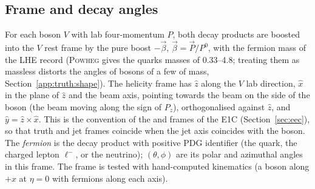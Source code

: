 \subsection{Frame and decay angles}
\label{app:truth:frame}
For each boson $V$ with lab four-momentum $P$, both decay products are boosted into the $V$ rest frame by the pure boost
$-\vec\beta$, $\vec\beta = \vec P/P^0$, with the fermion mass of the LHE record (\textsc{Powheg} gives the quarks masses
of 0.33--4.8\GeV; treating them as massless distorts the angles of bosons of a few\GeV{} of mass,
Section~\ref{app:truth:shape}). The helicity frame has
$\hat z$ along the $V$ lab direction, $\hat x$ in the plane of $\hat z$ and the beam axis, pointing towards the beam
on the side of the boson (the beam moving along the sign of $P_z$), orthogonalised against $\hat z$, and
$\hat y = \hat z \times \hat x$. This is the convention of the  and  frames of the E1C
(Section~\ref{sec:eec}), so that truth and jet frames coincide when the jet axis coincides with the boson. The
\emph{fermion} is the decay product with positive PDG identifier (the quark, the charged lepton $\ell^-$, or the
neutrino); $(\theta,\phi)$ are its polar and azimuthal angles in this frame. The frame is tested with hand-computed
kinematics (a boson along $+x$ at $\eta = 0$ with fermions along each axis).


